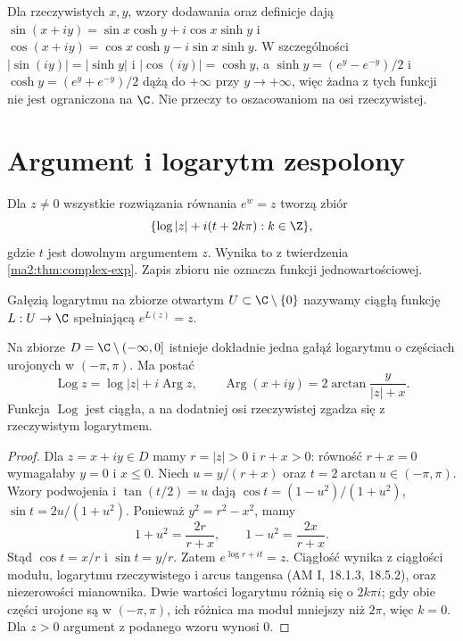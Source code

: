 \begin{przyklad}
Dla rzeczywistych $x,y$, wzory dodawania oraz definicje dają
$\sin(x+iy)=\sin x\cosh y+i\cos x\sinh y$ i
$\cos(x+iy)=\cos x\cosh y-i\sin x\sinh y$.
W szczególności $|\sin(iy)|=|\sinh y|$ i $|\cos(iy)|=\cosh y$,
a $\sinh y=(e^y-e^{-y})/2$ i $\cosh y=(e^y+e^{-y})/2$
dążą do $+\infty$ przy $y\to+\infty$, więc żadna z tych
funkcji nie jest ograniczona na $\C$.
Nie przeczy to oszacowaniom na osi rzeczywistej.
\end{przyklad}

\section{Argument i logarytm zespolony}

Dla $z\ne0$ wszystkie rozwiązania równania $e^w=z$ tworzą
zbiór
\[
 \{\log|z|+i(t+2k\pi):k\in\Z\},
\]
gdzie $t$ jest dowolnym argumentem $z$. Wynika to z twierdzenia
\ref{ma2:thm:complex-exp}. Zapis zbioru nie oznacza funkcji
jednowartościowej.

\begin{definicja}
\label{ma2:def:log-branch}
Gałęzią logarytmu na zbiorze otwartym $U\subset\C\setminus\{0\}$
nazywamy ciągłą funkcję $L:U\to\C$ spełniającą $e^{L(z)}=z$.
\end{definicja}

\begin{twierdzenie}
\label{ma2:thm:principal-log}
Na zbiorze $D=\C\setminus(-\infty,0]$ istnieje dokładnie jedna
gałąź logarytmu o częściach urojonych w $(-\pi,\pi)$.
Ma postać
\[
 \operatorname{Log}z=\log|z|+i\operatorname{Arg}z,\qquad
 \operatorname{Arg}(x+iy)=2\arctan\frac{y}{|z|+x}.
\]
Funkcja $\operatorname{Log}$ jest ciągła, a na dodatniej osi
rzeczywistej zgadza się z rzeczywistym logarytmem.
\end{twierdzenie}
\begin{proof}
Dla $z=x+iy\in D$ mamy $r=|z|>0$ i $r+x>0$: równość
$r+x=0$ wymagałaby $y=0$ i $x\le0$. Niech
$u=y/(r+x)$ oraz $t=2\arctan u\in(-\pi,\pi)$.
Wzory podwojenia i $\tan(t/2)=u$ dają
$\cos t=(1-u^2)/(1+u^2)$, $\sin t=2u/(1+u^2)$.
Ponieważ $y^2=r^2-x^2$, mamy
\[
 1+u^2=\frac{2r}{r+x},\qquad 1-u^2=\frac{2x}{r+x}.
\]
Stąd $\cos t=x/r$ i $\sin t=y/r$. Zatem
$e^{\log r+it}=z$. Ciągłość wynika z ciągłości modułu,
logarytmu rzeczywistego i arcus tangensa (AM I, 18.1.3,
18.5.2), oraz niezerowości mianownika. Dwie wartości
logarytmu różnią się o $2k\pi i$; gdy obie części urojone są
w $(-\pi,\pi)$, ich różnica ma moduł mniejszy niż $2\pi$,
więc $k=0$. Dla $z>0$ argument z podanego wzoru wynosi $0$.
\end{proof}

